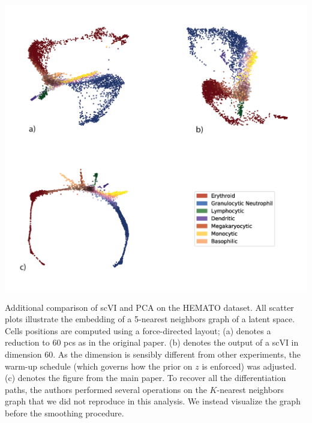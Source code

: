 \begin{suppfigure}
\centering
\includegraphics[width=\textwidth]{figures/hemato_supp.png}
\caption[Additional comparison of scVI and PCA on the HEMATO dataset]{Additional comparison of scVI and PCA on the HEMATO dataset. All scatter plots illustrate the embedding of a 5-nearest neighbors graph of a latent space. Cells positions are computed using a force-directed layout; (a) denotes a reduction to 60 pcs as in the original paper. (b) denotes the output of a scVI in dimension 60. As the dimension is sensibly different from other experiments, the warm-up schedule (which governs how the prior on $z$ is enforced) was adjusted. (c) denotes the figure from the main paper. To recover all the differentiation paths, the authors performed several operations on the $K$-nearest neighbors graph that we did not reproduce in this analysis. We instead visualize the graph before the smoothing procedure.}
\label{scvihemato_supp}
\end{suppfigure}


